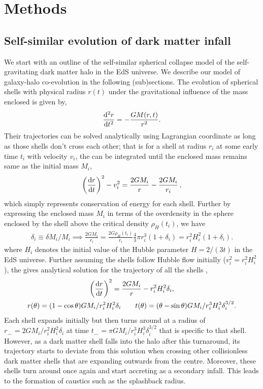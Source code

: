 \section{Methods}
\label{sec:methods}
\subsection{Self-similar evolution of dark matter infall}
\label{sec:methods-dm}
We start with an outline of the self-similar spherical collapse model of the self-gravitating dark matter halo in the EdS universe. We describe our model of galaxy-halo co-evolution in the following (sub)sections. The evolution of spherical shells with physical radius $r(t)$ under the gravitational influence of the mass enclosed is given by, 
\begin{align}
\label{eq:dm_traj_phys_accl}
\frac{{\rm d}^2 r}{{\rm d} t^2} = - \frac{GM(r,t)}{r^2}.
\end{align}
Their trajectories can be solved analytically using Lagrangian coordinate as long as those shells don't cross each other; that is for a shell at radius $r_i$ at some early time $t_i$ with velocity $v_i$, the  can be integrated until the enclosed mass remains same as the initial mass $M_i$,
\begin{align}
\label{eq:dm_traj_phys_ener}
\left( \frac{{\rm d} r}{{\rm d} t} \right)^2 - v_i^2 = \frac{2GM_i}{r} - \frac{2GM_i}{r_i}\,,
\end{align}
which simply represents conservation of energy for each shell.
Further by expressing the enclosed mass $M_i$ in terms of the overdensity in the sphere enclosed by the shell above the critical density $\rho_H(t_i)$, we have
\begin{align}
\nonumber
\delta_i \equiv \delta M_i / M_i \implies \frac{2GM_i}{r_i} = \frac{2G \rho_H(t_i)}{r_i} \frac{4}{3}\pi r_i^3 (1+\delta_i) = r_i^2 H_i^2 (1+\delta_i).
\end{align}
where $H_i$ denotes the initial value of the Hubble parameter $H=2/(3t)$ in the EdS universe. Further assuming the shells follow Hubble flow initially
($v_i^2 = r_i^2 H_i^2$), 
the  gives analytical solution for the trajectory of all the shells \cite{1993paddy_strucformbook},
\begin{gather}
\left( \frac{{\rm d} r}{{\rm d} t} \right)^2 = \frac{2GM_i}{r} - r_i^2 H_i^2 \delta_i,\\
\label{eq:dm_traj_soln_phys}
r(\theta) = (1 - \cos \theta) G M_i/r_i^2 H_i^2 \delta_i \qquad t(\theta) = (\theta - \sin \theta) G M_i/r_i^3 H_i^3 \delta_i^{3/2}.
\end{gather}
Each shell expands initially but then turns around at a radius of $r_{\smallfrown}= 2G M_i/r_i^2 H_i^2 \delta_i$ at time $t_{\smallfrown} = \pi G M_i/r_i^3 H_i^3 \delta_i^{3/2}$ that is specific to that shell. 
However, as a dark matter shell falls into the halo after this turnaround,
its trajectory starts to deviate from this solution when crossing other collisionless dark matter shells that are expanding outwards from the centre. 
Moreover, these shells turn around once again and start accreting as a secondary infall. This leads to the formation of caustics such as the splashback radius. 

